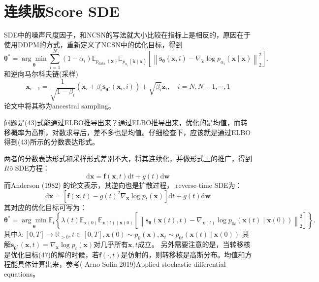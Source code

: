 \section{连续版Score SDE}
SDE中的噪声尺度因子，和NCSN的写法就大小比较在指标上是相反的，原因在于使用DDPM的方式，重新定义了NCSN中的优化目标，得到
\begin{equation}
\boldsymbol{\theta}^*=\underset{\boldsymbol{\theta}}{\arg \min } \sum_{i=1}^N\left(1-\alpha_i\right) \mathbb{E}_{p_{\text {data }}(\mathbf{x})} \mathbb{E}_{p_{\alpha_i}(\tilde{\mathbf{x}} \mid \mathbf{x})}\left[\left\|\mathbf{s}_{\boldsymbol{\theta}}(\tilde{\mathbf{x}}, i)-\nabla_{\tilde{\mathbf{x}}} \log p_{\alpha_i}(\tilde{\mathbf{x}} \mid \mathbf{x})\right\|_2^2\right] .
\end{equation}
和逆向马尔科夫链(采样)
\begin{equation}
\mathbf{x}_{i-1}=\frac{1}{\sqrt{1-\beta_i}}\left(\mathbf{x}_i+\beta_i \mathbf{s}_{\boldsymbol{\theta}^*}\left(\mathbf{x}_i, i\right)\right)+\sqrt{\beta_i} \mathbf{z}_i, \quad i=N, N-1, \cdots, 1
\end{equation}
论文中将其称为ancestral sampling。

问题是(43)式能通过ELBO推导出来？通过ELBO推导出来，优化的是均值，而转移概率为高斯，对数求导后，差不多也是均值。仔细检查下，应该就是通过ELBO得到(43)所示的分数表达形式。

两者的分数表达形式和采样形式差别不大，将其连续化，并做形式上的推广，得到$It\hat{o}$ SDE方程：
\begin{equation}
\mathrm{d} \mathbf{x}=\mathbf{f}(\mathbf{x}, t) \mathrm{d} t+g(t) \mathrm{d} \mathbf{w}
\end{equation}
而Anderson (1982) 的论文表示，其逆向也是扩散过程， reverse-time SDE为：
\begin{equation}
\mathrm{d} \mathbf{x}=\left[\mathbf{f}(\mathbf{x}, t)-g(t)^2 \nabla_{\mathbf{x}} \log p_t(\mathbf{x})\right] \mathrm{d} t+g(t) \mathrm{d} \overline{\mathbf{w}}
\end{equation}
其对应的优化目标可写为：
\begin{equation}
\boldsymbol{\theta}^*=\underset{\boldsymbol{\theta}}{\arg \min } \mathbb{E}_t\left\{\lambda(t) \mathbb{E}_{\mathbf{x}(0)} \mathbb{E}_{\mathbf{x}(t) \mid \mathbf{x}(0)}\left[\left\|\mathbf{s}_{\boldsymbol{\theta}}(\mathbf{x}(t), t)-\nabla_{\mathbf{x}(t)} \log p_{0 t}(\mathbf{x}(t) \mid \mathbf{x}(0))\right\|_2^2\right]\right\} .
\end{equation}
其中$\lambda:[0, T] \rightarrow \mathbb{R}_{>0}, t\in [0, T], \mathbf{x}(0) \sim p_0(\mathbf{x}), \mathbf{x}_t \sim p_{0t}(\mathbf{x}(t) \mid \mathbf{x}(0))$
其解$\mathbf{s}_{\boldsymbol{\theta}^*}\left(\mathbf{x}, t\right)=\nabla_{\mathbf{x}} \log p_{t}(\mathbf{x})$对几乎所有$\mathbf{x}, t$成立。
另外需要注意的是，当转移核是优化目标(47)的解的时候，若$\mathbf{f}(\cdot, t)$是仿射的，则转移核是高斯分布。均值和方程能具体计算出来，参考( Arno Solin 2019)Applied stochastic differential equations。


